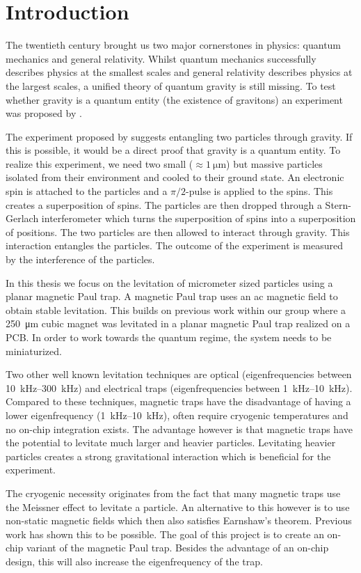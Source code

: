 \chapter{Introduction}
\label{chap:introduction}
The twentieth century brought us two major cornerstones in physics: quantum mechanics and general relativity. Whilst quantum mechanics successfully describes physics at the smallest scales and general relativity describes physics at the largest scales, a unified theory of quantum gravity is still missing. To test whether gravity is a quantum entity (the existence of gravitons) an experiment was proposed by \textcite{bose_spin_2017}.

The experiment proposed by \citeauthor{bose_spin_2017} suggests entangling two particles through gravity. If this is possible, it would be a direct proof that gravity is a quantum entity. To realize this experiment, we need two small ($\approx \qty{1}{\micro\meter}$) but massive particles isolated from their environment and cooled to their ground state. An electronic spin is attached to the particles and a $\pi/2$-pulse is applied to the spins. This creates a superposition of spins. The particles are then dropped through a Stern-Gerlach interferometer which turns the superposition of spins into a superposition of positions. The two particles are then allowed to interact through gravity. This interaction entangles the particles. The outcome of the experiment is measured by the interference of the particles.

In this thesis we focus on the levitation of micrometer sized particles using a planar magnetic Paul trap. A magnetic Paul trap uses an ac magnetic field to obtain stable levitation. This builds on previous work within our group where a \qty{250}{\micro\meter} cubic  magnet was levitated in a planar magnetic Paul trap realized on a PCB\cite{eli, mart}. In order to work towards the quantum regime, the system needs to be miniaturized.

Two other well known levitation techniques are optical (eigenfrequencies between \qtyrange{10}{300}{\kilo\hertz}) and electrical traps (eigenfrequencies between \qtyrange{1}{10}{\kilo\hertz})\cite{levitodynamics}. Compared to these techniques, magnetic traps have the disadvantage of having a lower eigenfrequency (\qtyrange{1}{10}{\kilo\hertz}), often require cryogenic temperatures and no on-chip integration exists\cite{levitodynamics}. The advantage however is that magnetic traps have the potential to levitate much larger and heavier particles. Levitating heavier particles creates a strong gravitational interaction which is beneficial for the experiment.

The cryogenic necessity originates from the fact that many magnetic traps use the Meissner effect to levitate a particle. An alternative to this however is to use non-static magnetic fields which then also satisfies Earnshaw's theorem. Previous work has shown this to be possible\cite{perdriat,eli,mart}. The goal of this project is to create an on-chip variant of the magnetic Paul trap. Besides the advantage of an on-chip design, this will also increase the eigenfrequency of the trap\cite{perdriat}.

